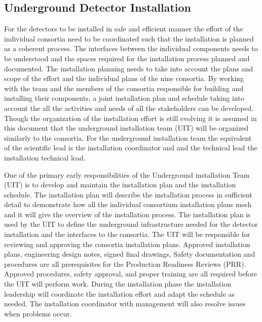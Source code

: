 

\subsection{Underground Detector Installation}
\label{sec:fdsp-coord-undergd}

For the  detectors to be installed in safe and efficient
manner the effort of the individual consortia need to be coordinated
such that the installation is planned as a coherent process. The
interfaces between the individual components needs to be understood
and the spaces required for the installation process planned and
documented. The installation planning needs to take into account the
plans and scope of the  effort and the individual plans of
the nine consortia. By working with the  team and the
members of the consortia responsible for building and installing their
components, a joint installation plan and schedule taking into account
the all the activities and needs of all the stakeholders can be
developed. Though the organization of the installation effort is still
evolving it is assumed in this document that the underground
installation team (UIT) will be organized similarly to the
consortia. For the underground installation team the equivalent of the scientific
lead is the installation coordinator and and the technical lead
the installation technical lead.

One of the primary early responsibilities of the Underground
installation Team (UIT)  is to develop and
maintain the  installation plan and the installation
schedule. The  installation plan will describe the
installation process in sufficient detail to demonstrate how all the
individual consortium installation plans mesh and it will give the
overview of the installation process. The installation plan is used by the UIT to define the underground infrastructure needed for the detector installation and the interfaces to the consortia. The UIT will be responsible for reviewing and approving the consortia installation plans. Approved
installation plans, engineering design notes, signed final drawings,
Safety documentation and procedures are all prerequisites for the
Production Readiness Reviews (PRR). Approved procedures, safety
approval, and proper training are all required before the UIT will
perform work. During the installation phase the installation leadership will
coordinate the  installation effort and adapt the schedule as
needed. The installation coordinator with management will also resolve
issues when problems occur. 

